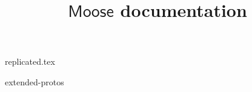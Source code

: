 \documentclass{article}
\begin{document}
%
\newcommand{\mainsection}[1]{\newpage \section{#1}}
\newcommand{\msubsection}[1]{\newpage \subsection{#1}}
\newcommand{\msubsubsection}[1]{\subsubsection{#1}}

\title{$\mathsf{Moose}$ documentation}


\maketitle
\tableofcontents

\thispagestyle{fancy}




{replicated.tex}


\newpage
%



\clearpage
\appendix


{extended-protos}
\end{document}
